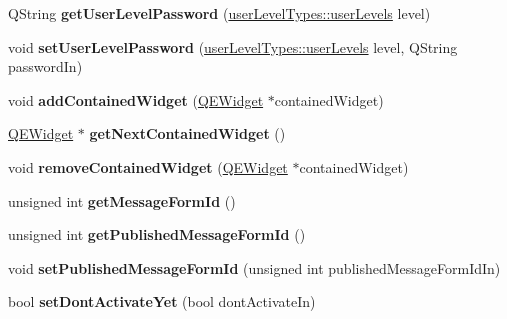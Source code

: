 \begin{DoxyCompactItemize}
\item 
\hypertarget{classContainerProfile_a1da65df910a3604eb679f3bba7126df7}{
QString {\bfseries getUserLevelPassword} (\hyperlink{classuserLevelTypes_a033cf2a40f620286b1839dd360c8497b}{userLevelTypes::userLevels} level)}
\label{classContainerProfile_a1da65df910a3604eb679f3bba7126df7}

\item 
\hypertarget{classContainerProfile_a689e5c017c0655d76288042b9088a829}{
void {\bfseries setUserLevelPassword} (\hyperlink{classuserLevelTypes_a033cf2a40f620286b1839dd360c8497b}{userLevelTypes::userLevels} level, QString passwordIn)}
\label{classContainerProfile_a689e5c017c0655d76288042b9088a829}

\item 
\hypertarget{classContainerProfile_a64f106811c4f116a50d11b349eafe9d0}{
void {\bfseries addContainedWidget} (\hyperlink{classQEWidget}{QEWidget} $\ast$containedWidget)}
\label{classContainerProfile_a64f106811c4f116a50d11b349eafe9d0}

\item 
\hypertarget{classContainerProfile_ab1d9ce7ef55e256772a570d02b4552dd}{
\hyperlink{classQEWidget}{QEWidget} $\ast$ {\bfseries getNextContainedWidget} ()}
\label{classContainerProfile_ab1d9ce7ef55e256772a570d02b4552dd}

\item 
\hypertarget{classContainerProfile_ac70241a11d904cb7b71ad213b6104923}{
void {\bfseries removeContainedWidget} (\hyperlink{classQEWidget}{QEWidget} $\ast$containedWidget)}
\label{classContainerProfile_ac70241a11d904cb7b71ad213b6104923}

\item 
\hypertarget{classContainerProfile_a5983f949b8a23713bdb78434b1b9f12e}{
unsigned int {\bfseries getMessageFormId} ()}
\label{classContainerProfile_a5983f949b8a23713bdb78434b1b9f12e}

\item 
\hypertarget{classContainerProfile_a0a40488cac9ddc78d8e3d39cde8759d6}{
unsigned int {\bfseries getPublishedMessageFormId} ()}
\label{classContainerProfile_a0a40488cac9ddc78d8e3d39cde8759d6}

\item 
\hypertarget{classContainerProfile_a8069d53b56a9805e969e1aead88baf33}{
void {\bfseries setPublishedMessageFormId} (unsigned int publishedMessageFormIdIn)}
\label{classContainerProfile_a8069d53b56a9805e969e1aead88baf33}

\item 
\hypertarget{classContainerProfile_a8e1a31812e9b1a38557da7bd54f9b765}{
bool {\bfseries setDontActivateYet} (bool dontActivateIn)}
\label{classContainerProfile_a8e1a31812e9b1a38557da7bd54f9b765}


\end{DoxyCompactItemize}

